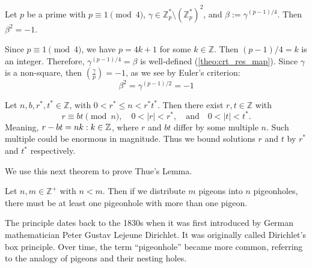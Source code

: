 \newpage

\begin{theo}

    Let \( p \) be a prime with \( p \equiv 1 \pmod{4} \), \( \gamma \in \mathbb{Z}_p^* \setminus (\mathbb{Z}_p^*)^2 \), and \( \beta := \gamma^{(p-1)/4} \). Then \( \beta^2 = -1 \).

\end{theo}
\begin{Proof}

    Since \( p \equiv 1 \pmod{4} \), we have \( p = 4k + 1 \) for some \( k \in \mathbb{Z} \). Then \( (p-1)/4 = k \) is an integer.
    Therefore, \( \gamma^{(p-1)/4} = \beta \) is well-defined (\ref{theo:crt_res_map}). Since $\gamma$ is a non-square, then $\left(\frac{\gamma}{p}\right)=-1$, as we see by Euler's criterion:
   \Large \[ \beta^2 = \gamma^{(p-1)/2} = -1 \]
   \normalsize
\end{Proof}

\begin{theo}

    Let \( n, b, r^*, t^* \in \mathbb{Z} \), with \( 0 < r^* \leq n < r^*t^* \). Then there exist \( r, t \in \mathbb{Z} \) with
\[
r \equiv bt \pmod{n}, \quad 0<|r| < r^*, \quad \text{and} \quad 0 < |t| < t^*.
\]
\noindent
Meaning, $r-bt=nk:k\in\mathbb{Z}$, where $r$ and $bt$ differ by some multiple $n$. Such multiple could be enormous in magnitude. Thus we bound solutions $r$ and $t$ by $r^*$ and $t^*$ respectively.
\end{theo}
\noindent
We use this next theorem to prove Thue's Lemma.
\begin{theo}

    Let \( n, m \in \mathbb{Z}^+ \) with \( n < m \). Then if we distribute \( m \) pigeons into \( n \) pigeonholes, there must be at least one pigeonhole with more than one pigeon.
\end{theo}
\vspace{1em}
\begin{Tip}
    The principle dates back to the 1830s when it was first introduced by German mathematician Peter Gustav Lejeune Dirichlet. It was originally called Dirichlet's box principle. Over time, the term “pigeonhole” became more common, referring to the analogy of pigeons and their nesting holes.
\end{Tip}

